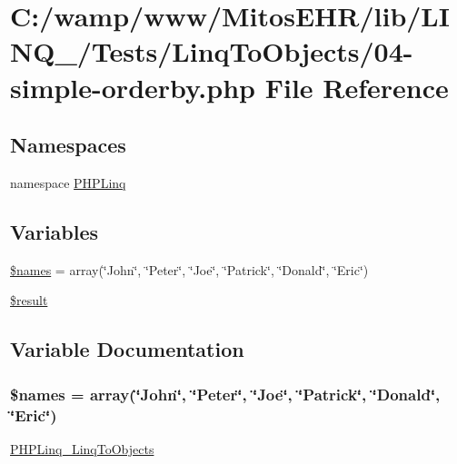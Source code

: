 \hypertarget{_linq_to_objects_204-simple-orderby_8php}{\section{\-C\-:/wamp/www/\-Mitos\-E\-H\-R/lib/\-L\-I\-N\-Q\-\_/\-Tests/\-Linq\-To\-Objects/04-\/simple-\/orderby.php \-File \-Reference}
\label{_linq_to_objects_204-simple-orderby_8php}
}
\subsection*{\-Namespaces}
\begin{DoxyCompactItemize}
\item 
namespace \hyperlink{namespace_p_h_p_linq}{\-P\-H\-P\-Linq}
\end{DoxyCompactItemize}
\subsection*{\-Variables}
\begin{DoxyCompactItemize}
\item 
\hyperlink{_linq_to_objects_204-simple-orderby_8php_affd6fc4c8210d8b9b164c72a0332e732}{\$names} = array(\char`\"{}\-John\char`\"{}, \char`\"{}\-Peter\char`\"{}, \char`\"{}\-Joe\char`\"{}, \char`\"{}\-Patrick\char`\"{}, \char`\"{}\-Donald\char`\"{}, \char`\"{}\-Eric\char`\"{})
\item 
\hyperlink{_linq_to_objects_204-simple-orderby_8php_a112ef069ddc0454086e3d1e6d8d55d07}{\$result}
\end{DoxyCompactItemize}


\subsection{\-Variable \-Documentation}
\hypertarget{_linq_to_objects_204-simple-orderby_8php_affd6fc4c8210d8b9b164c72a0332e732}{
\subsubsection[{\$names}]{\setlength{\rightskip}{0pt plus 5cm}\$names = array(\char`\"{}\-John\char`\"{}, \char`\"{}\-Peter\char`\"{}, \char`\"{}\-Joe\char`\"{}, \char`\"{}\-Patrick\char`\"{}, \char`\"{}\-Donald\char`\"{}, \char`\"{}\-Eric\char`\"{})}}\label{_linq_to_objects_204-simple-orderby_8php_affd6fc4c8210d8b9b164c72a0332e732}
\hyperlink{class_p_h_p_linq___linq_to_objects}{\-P\-H\-P\-Linq\-\_\-\-Linq\-To\-Objects} 

